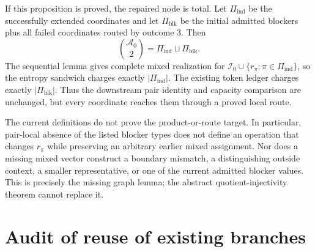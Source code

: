 \documentclass[11pt]{article}
\newcommand{\Coords}{\mathcal I}
\newcommand{\Pair}{\Pi}
\begin{document}
If this proposition is proved, the repaired node is total.  Let
$\Pair_{\mathrm{ind}}$ be the successfully extended coordinates and let
$\Pair_{\mathrm{blk}}$ be the initial admitted blockers plus all failed
coordinates routed by outcome 3.  Then
\[
\binom{\mathcal A_0}{2}
=\Pair_{\mathrm{ind}}\sqcup\Pair_{\mathrm{blk}}.
\]
The sequential lemma gives complete mixed realization for
$\Coords_0\cup\{r_\pi:\pi\in\Pair_{\mathrm{ind}}\}$, so the entropy
sandwich charges exactly $|\Pair_{\mathrm{ind}}|$.  The existing token ledger
charges exactly $|\Pair_{\mathrm{blk}}|$.  Thus the downstream pair identity
and capacity comparison are unchanged, but every coordinate reaches them
through a proved local route.

The current definitions do not prove the product-or-route target.  In
particular, pair-local absence of the listed blocker types does not define an
operation that changes $r_\pi$ while preserving an arbitrary earlier mixed
assignment.  Nor does a missing mixed vector construct a boundary mismatch,
a distinguishing outside context, a smaller representative, or one of the
current admitted blocker values.  This is precisely the missing graph lemma;
the abstract quotient-injectivity theorem cannot replace it.

\section{Audit of reuse of existing branches}
\end{document}
